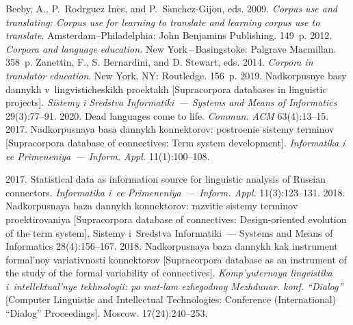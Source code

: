 \begin{multicols}{2}
{{\begin{thebibliography}{99}
Beeby, A., P.~\mbox{Rodr{\!\ptb{\'{\i}}}guez} In$\acute{\mbox{e}}$s, and 
P.~S$\acute{\mbox{a}}$nchez-Gij$\acute{\mbox{o}}$n, eds. 2009. 
\textit{Corpus use and translating: Corpus use for learning to translate 
and learning corpus use to translate}. Amsterdam--Philadelphia: John Benjamins Publishing. 149~p.
 2012. \textit{Corpora and language education.} New York\,--\,Basingstoke: Palgrave Macmillan. 
358~p.
Zanettin, F., S. Bernardini, and D. Stewart, eds. 2014. \textit{Corpora in translator education}. New York, NY: 
Routledge. 156~p.
 2019. Nadkorpusnye basy dannykh 
v~lingvisticheskikh proektakh [Supracorpora databases in linguistic projects]. \textit{Sistemy i Sredstva 
Informatiki~--- Systems and Means of Informatics} 29(3):77--91.
 2020. Dead languages come to life. \textit{Commun. ACM} 63(4):13--15.
 2017. Nadkorpusnaya basa dannykh konnektorov: 
postroenie sistemy terminov [Supracorpora database of connectives: Term system development]. 
\textit{Informatika i ee Primeneniya~--- Inform. Appl.} 11(1):100--108.

 2017. Statistical data as information source for linguistic analysis of 
Russian connectors. \textit{Informatika i~ee Primeneniya~--- Inform. Appl.} 11(3):123--131.
 2018. Nadkorpusnaya baza dannykh konnektorov: razvitie 
sistemy terminov proektirovaniya [Supracorpora database of connectives: Design-oriented evolution of the term 
system]. Sistemy i~Sredstva Informatiki~--- Systems and Means of Informatics 28(4):156--167.
 2018. Nadkorpusnaya baza dannykh kak instrument formal'noy variativnosti 
konnektorov [Supracorpora database as an instrument of the study of the formal variability of connectives]. 
\textit{Komp'yuternaya lingvistika 
i~intellektual'nye tekhnologii: po mat-lam ezhegodnoy Mezhdunar. konf. 
``Dialog''} [Computer Linguistic and Intellectual Technologies: Conference (International) ``Dialog'' 
Proceedings]. Moscow. 17(24):240--253.


\end{thebibliography}}}
\end{multicols}
